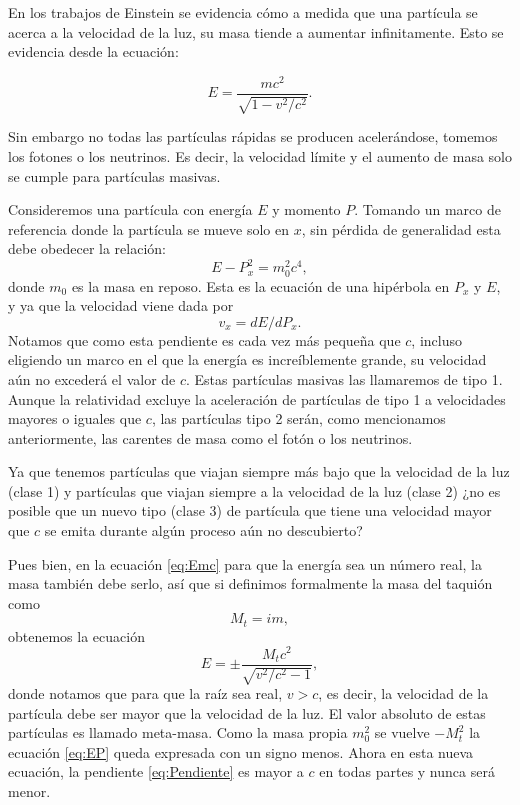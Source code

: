 \documentclass[twocolumn,preprintnumbers,amsmath,amssymb]{revtex4}
\begin{document}
En los trabajos de Einstein se evidencia cómo a medida que una partícula se acerca a la velocidad de la luz, su masa tiende a aumentar infinitamente. Esto se evidencia desde la ecuación:

\begin{equation}
E = \frac{mc^2}{\sqrt{1-v^2/c^2}}.
\label{eq:Emc}
\end{equation}

Sin embargo no todas las partículas rápidas se producen acelerándose, tomemos los fotones o los neutrinos.
Es decir, la velocidad límite y el aumento de masa solo se cumple para partículas masivas.

Consideremos una partícula con energía $E$ y momento $P$. Tomando un marco de referencia donde la partícula se mueve solo en $x$, sin pérdida de generalidad esta debe obedecer la relación:
%
\begin{equation}
E - P_{x}^2 = m_0^2 c^4,
\label{eq:EP}
\end{equation}
%
donde $m_0$ es la masa en reposo. Esta es la ecuación de una hipérbola en $P_x$ y $E$, y  ya que la velocidad viene dada por 
\begin{equation}
v_x = dE/dP_x.
\label{eq:Pendiente}
\end{equation}
Notamos que como esta pendiente es cada vez más pequeña que $c$, incluso eligiendo un marco en el que la energía es increíblemente grande, su velocidad aún no excederá el valor de $c$. Estas partículas masivas las llamaremos de tipo 1.  Aunque la relatividad excluye la aceleración de partículas de tipo 1 a velocidades mayores o iguales que $c$, las partículas tipo 2 serán, como mencionamos anteriormente, las carentes de masa como el fotón o los neutrinos.

Ya que tenemos partículas que viajan siempre más bajo que la velocidad de la luz (clase 1) y partículas que viajan siempre a la velocidad de la luz (clase 2) ¿no es posible que un nuevo tipo (clase 3) de partícula que tiene una velocidad mayor que $c$ se emita durante algún proceso aún no descubierto?
 
 Pues bien, en la ecuación \eqref{eq:Emc} para que la energía sea un número real, la masa también debe serlo, así que si definimos formalmente la masa del taquión como 
 \begin{equation}
 M_t = im ,
 \label{eq:Mt}
 \end{equation}
 obtenemos la ecuación 
 \begin{equation}
E = \pm \frac{M_t c^2}{\sqrt{v^2/c^2 - 1}} ,
\label{eq:Emtc}
\end{equation}
%
donde notamos que para que la raíz sea real, $v>c$, es decir, la velocidad de la partícula debe ser mayor que la velocidad de la luz. El valor absoluto de estas partículas es llamado meta-masa. Como la masa propia $m_0^2$ se vuelve $-M_t^2$ la ecuación \eqref{eq:EP} queda expresada con un signo menos. Ahora en esta nueva ecuación, la pendiente \eqref{eq:Pendiente} es mayor a $c$ en todas partes y nunca será menor.
\end{document}
